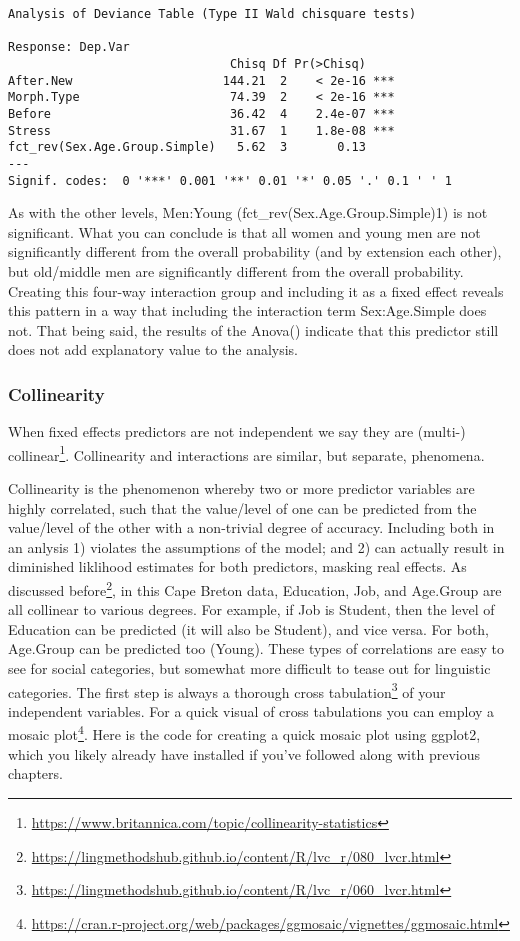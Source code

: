 \documentclass[
  10pt,
  letterpaper]{article}
\renewcommand\texttt[1]{{\ttfamily\color{BrickRed}#1}}
\DeclareRobustCommand{\href}[2]{#2\footnote{\url{#1}}}
\begin{document}
\begin{verbatim}
Analysis of Deviance Table (Type II Wald chisquare tests)

Response: Dep.Var
                               Chisq Df Pr(>Chisq)    
After.New                     144.21  2    < 2e-16 ***
Morph.Type                     74.39  2    < 2e-16 ***
Before                         36.42  4    2.4e-07 ***
Stress                         31.67  1    1.8e-08 ***
fct_rev(Sex.Age.Group.Simple)   5.62  3       0.13    
---
Signif. codes:  0 '***' 0.001 '**' 0.01 '*' 0.05 '.' 0.1 ' ' 1
\end{verbatim}

As with the other levels, \texttt{Men:Young}
(\texttt{fct\_rev(Sex.Age.Group.Simple)1}) is not significant. What you
can conclude is that all women and young men are not significantly
different from the overall probability (and by extension each other),
but old/middle men are significantly different from the overall
probability. Creating this four-way interaction group and including it
as a fixed effect reveals this pattern in a way that including the
interaction term \texttt{Sex:Age.Simple} does not. That being said, the
results of the \texttt{Anova()} indicate that this predictor still does
not add explanatory value to the analysis.

\hypertarget{collinearity}{%
\subsubsection{Collinearity}\label{collinearity}}

When fixed effects predictors are not independent we say they are
(multi-)
\href{https://www.britannica.com/topic/collinearity-statistics}{collinear}.
Collinearity and interactions are similar, but separate, phenomena.

Collinearity is the phenomenon whereby two or more predictor variables
are highly correlated, such that the value/level of one can be predicted
from the value/level of the other with a non-trivial degree of accuracy.
Including both in an anlysis 1) violates the assumptions of the model;
and 2) can actually result in diminished liklihood estimates for both
predictors, masking real effects. As discussed
\href{https://lingmethodshub.github.io/content/R/lvc_r/080_lvcr.html}{before},
in this Cape Breton data, \texttt{Education}, \texttt{Job}, and
\texttt{Age.Group} are all collinear to various degrees. For example, if
\texttt{Job} is \texttt{Student}, then the level of \texttt{Education}
can be predicted (it will also be \texttt{Student}), and vice versa. For
both, \texttt{Age.Group} can be predicted too (\texttt{Young}). These
types of correlations are easy to see for social categories, but
somewhat more difficult to tease out for linguistic categories. The
first step is always a thorough
\href{https://lingmethodshub.github.io/content/R/lvc_r/060_lvcr.html}{cross
tabulation} of your independent variables. For a quick visual of cross
tabulations you can employ a
\href{https://cran.r-project.org/web/packages/ggmosaic/vignettes/ggmosaic.html}{mosaic
plot}. Here is the code for creating a quick mosaic plot using
\texttt{ggplot2}, which you likely already have installed if you've
followed along with previous chapters.
\end{document}
